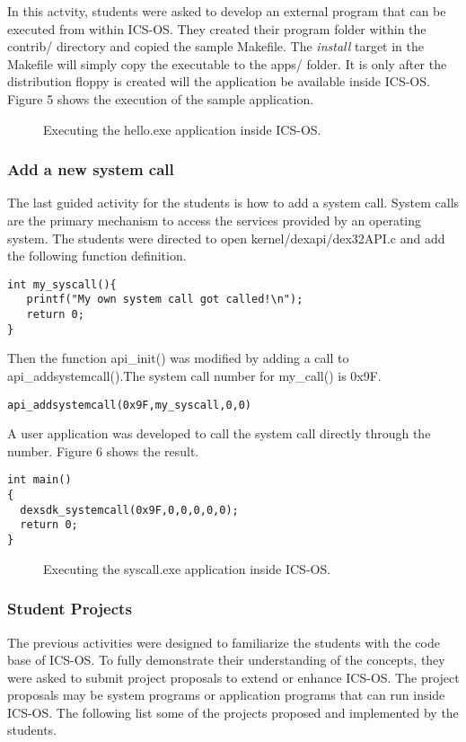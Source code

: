 \documentclass{acm_proc_article-sp}
\begin{document}
In this actvity, students were asked to develop an external program that can 
be executed from within ICS-OS. They created their program folder within
the contrib/ directory and copied the sample Makefile. The \textit{install}
target in the Makefile will simply copy the executable to the apps/ folder.
It is only after the distribution floppy is created will the application be
available inside ICS-OS. Figure 5 shows the execution of the sample 
application.

\begin{figure}
\centering
{}
\caption{Executing the hello.exe application inside ICS-OS.}
\end{figure}
 

\subsubsection{Add a new system call}
The last guided activity for the students is how to add a system call.
System calls are the primary mechanism to access the services provided 
by an operating system. The students were directed to open 
kernel/dexapi/dex32API.c and add the following function definition.

\begin{verbatim}
int my_syscall(){
   printf("My own system call got called!\n");
   return 0;
}
\end{verbatim}

Then the function api\_init() was modified by adding a call to 
api\_addsystemcall().The system call number for my\_call() is 0x9F.
\begin{verbatim}
api_addsystemcall(0x9F,my_syscall,0,0)
\end{verbatim}

A user application was developed to call the system call directly through 
the number. Figure 6 shows the result.

\begin{verbatim}
int main()
{
  dexsdk_systemcall(0x9F,0,0,0,0,0);
  return 0;
}
\end{verbatim}

\begin{figure}
\centering
{}
\caption{Executing the syscall.exe application inside ICS-OS.}
\end{figure}

\subsubsection{Student Projects}
The previous activities were designed to familiarize the students with
the code base of ICS-OS. To fully demonstrate their understanding of the 
concepts, they were asked to submit project proposals to extend or enhance
ICS-OS. The project proposals may be system programs or application programs
that can run inside ICS-OS. The following list some of the projects proposed
and implemented by the students.
\end{document}
